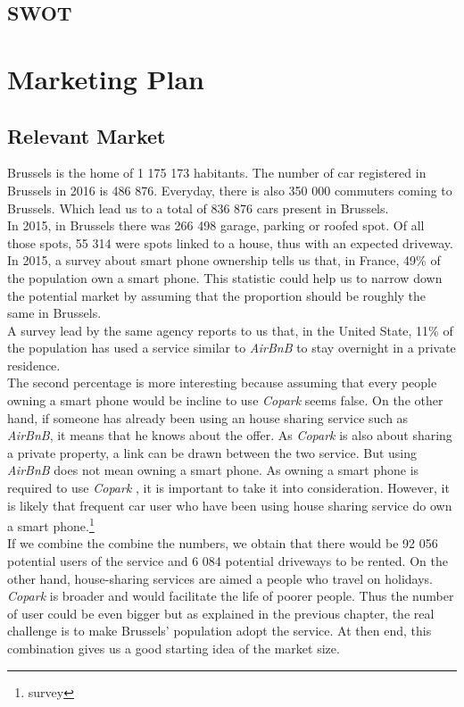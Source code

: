 \documentclass[12pt,a4paper,oneside]{book}
\newcommand{\bp}{\textit{Copark }}
\begin{document}
\section{SWOT}

\chapter{Marketing Plan}

\section{Relevant Market}
\label{rmar}
Brussels is the home of 1 175 173\cite{ciafb} habitants. The number of car registered in Brussels in 2016 is 486 876.\cite{mtvr} Everyday, there is also 350 000 commuters coming to Brussels.\cite{bxcommu} Which lead us to a total of 836 876 cars present in Brussels.\\
In 2015, in Brussels there was 266 498 garage, parking or roofed spot. Of all those spots, 55 314 were spots linked to a house, thus with an expected driveway.\cite{atpb}\\

In 2015, a survey about smart phone ownership tells us that, in France, 49\% of the population own a smart phone.\cite{spown} This statistic could help us to narrow down the potential market by assuming that the proportion should be roughly the same in Brussels.\\
A survey lead by the same agency reports to us that, in the United State, 11\% of the population has used a service similar to \textit{AirBnB} to stay overnight in a private residence.\cite{airbnbuse}\\
The second percentage is more interesting because assuming that every people owning a smart phone would be incline to use \bp seems false. On the other hand, if someone has already been using an house sharing service such as \textit{AirBnB}, it means that he knows about the offer. As \bp is also about sharing a private property, a link can be drawn between the two service. But using \textit{AirBnB} does not mean owning a smart phone. As owning a smart phone is required to use \bp, it is important to take it into consideration. However, it is likely that frequent car user who have been using house sharing service do own a smart phone.\footnote{survey}\\

If we combine the combine the numbers, we obtain that there would be 92 056 potential users of the service and 6 084 potential driveways to be rented. On the other hand, house-sharing services are aimed a people who travel on holidays. \bp is broader and would facilitate the life of poorer people. Thus the number of user could be even bigger but as explained in the previous chapter, the real challenge is to make Brussels' population adopt the service. At then end, this combination gives us a good starting idea of the market size.\\
\end{document}
